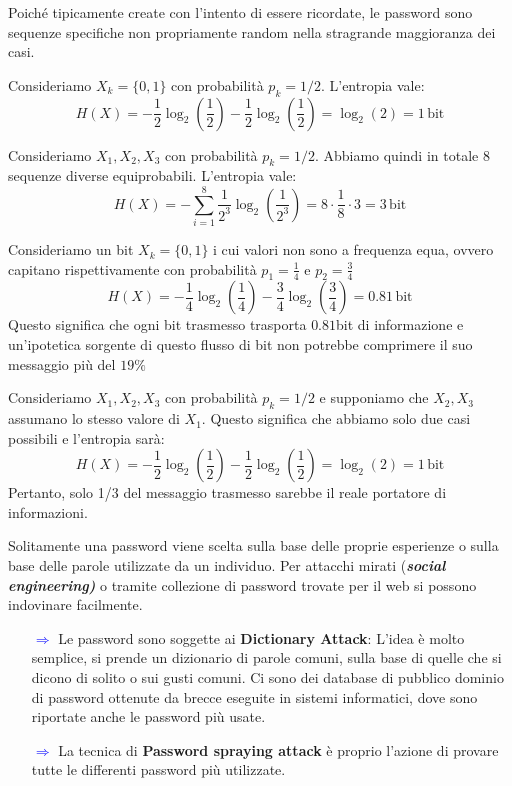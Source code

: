 \begin{definition}
Poiché tipicamente create con l'intento di essere ricordate, le password sono sequenze specifiche non propriamente random nella stragrande maggioranza dei casi.
\end{definition}
\begin{example}Consideriamo $X_k=\{0,1\}$ con probabilità $p_k=1/2$. L'entropia vale:\[H(X)=-\frac{1}{2}\log_{2}\left(\frac{1}{2}\right)-\frac{1}{2}\log_{2}\left(\frac{1}{2}\right)=\log_{2}(2)=1\,\text{bit}\]
\end{example}
\begin{example} Consideriamo $X_1,X_2,X_3$ con probabilità $p_k=1/2$. Abbiamo quindi in totale 8 sequenze diverse equiprobabili.
L'entropia vale: 
\[H(X)=-\sum_{i=1}^{8}\frac{1}{2^3}\log_{2}\left(\frac{1}{2^3}\right)=8\cdot\frac{1}{8}\cdot3=3\,\text{bit}\]
\end{example}
\begin{example}  Consideriamo un bit $X_k=\{0,1\}$ i cui valori non sono a frequenza equa, ovvero capitano rispettivamente con probabilità $p_1=\frac{1}{4}$ e $p_2=\frac{3}{4}$
\[H(X)=-\frac{1}{4}\log_{2}\left(\frac{1}{4}\right)-\frac{3}{4}\log_{2}\left(\frac{3}{4}\right)=0.81\,\text{bit}\]
Questo significa che ogni bit trasmesso trasporta $0.81$bit di informazione e un'ipotetica sorgente di questo flusso di bit non potrebbe comprimere il suo messaggio più del $19\%$
\end{example}
\begin{example} Consideriamo $X_1,X_2,X_3$ con probabilità $p_k=1/2$ e supponiamo che $X_2,X_3$ assumano lo stesso valore di $X_1$. Questo significa che abbiamo solo due casi possibili e l'entropia sarà:
\[H(X)=-\frac{1}{2}\log_{2}\left(\frac{1}{2}\right)-\frac{1}{2}\log_{2}\left(\frac{1}{2}\right)=\log_{2}(2)=1\,\text{bit}\]
Pertanto, solo 1/3 del messaggio trasmesso sarebbe il reale portatore di informazioni.
\end{example}
\begin{definition}[Predictability]
Solitamente una password viene scelta sulla base delle proprie esperienze o sulla base delle parole utilizzate da un individuo. Per attacchi mirati (\textit{\textbf{social engineering)}} o tramite collezione di password trovate per il web si possono indovinare facilmente.
\end{definition}
\begin{itemize}
    \item [\textcolor{blue}{$\Rightarrow$}]Le password sono soggette ai \textbf{Dictionary Attack}: L'idea è molto semplice, si prende un dizionario di parole comuni, sulla base di quelle che si dicono di solito o sui gusti comuni. Ci sono dei database di pubblico dominio di password ottenute da brecce eseguite in sistemi informatici, dove sono riportate anche le password più usate. 
    \item [\textcolor{blue}{$\Rightarrow$}]La tecnica di \textbf{Password spraying attack} è proprio l’azione di provare tutte le differenti password più utilizzate.
\end{itemize}
